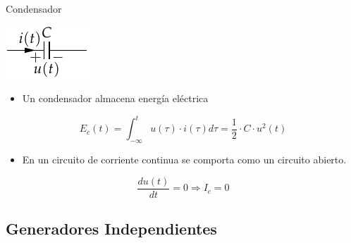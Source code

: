 \documentclass[aspectratio=169, usenames,svgnames,dvipsnames]{beamer}
\begin{document}
\begin{frame}[label={sec:org721abbf}]{Condensador}
\begin{center}
\includegraphics[height=0.2\textheight]{../figs/Condensador.pdf}
\end{center}

\begin{itemize}
\item Un condensador almacena \alert{energía eléctrica}
\end{itemize}

\[
  E_c(t) = \int_{-\infty}^t u(\tau) \cdot i(\tau) d\tau = \frac{1}{2} \cdot C \cdot u^2(t)
\]

\begin{itemize}
\item En un circuito de corriente continua se comporta como un circuito abierto.
\end{itemize}

\begin{equation*}
  \frac{du(t)}{dt} = 0 \Rightarrow I_c = 0
\end{equation*}
\end{frame}

\subsection{Generadores Independientes}
\label{sec:orgf7ad2f3}
\end{document}
